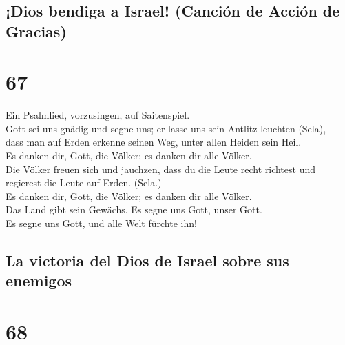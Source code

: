 \hypertarget{dios-bendiga-a-israel-canciuxf3n-de-acciuxf3n-de-gracias}{%
\subsection{¡Dios bendiga a Israel! (Canción de Acción de
Gracias)}\label{dios-bendiga-a-israel-canciuxf3n-de-acciuxf3n-de-gracias}}

\hypertarget{section-66}{%
\section{67}\label{section-66}}

 Ein Psalmlied, vorzusingen, auf Saitenspiel.\\
 Gott sei uns gnädig und segne uns; er lasse uns sein
Antlitz leuchten (Sela),\\
 dass man auf Erden erkenne seinen Weg, unter allen Heiden
sein Heil.\\
 Es danken dir, Gott, die Völker; es danken dir alle
Völker.\\
 Die Völker freuen sich und jauchzen, dass du die Leute
recht richtest und regierest die Leute auf Erden. (Sela.)\\
 Es danken dir, Gott, die Völker; es danken dir alle
Völker.\\
 Das Land gibt sein Gewächs. Es segne uns Gott, unser
Gott.\\
 Es segne uns Gott, und alle Welt fürchte ihn!

\hypertarget{la-victoria-del-dios-de-israel-sobre-sus-enemigos}{%
\subsection{La victoria del Dios de Israel sobre sus
enemigos}\label{la-victoria-del-dios-de-israel-sobre-sus-enemigos}}

\hypertarget{section-67}{%
\section{68}\label{section-67}}

